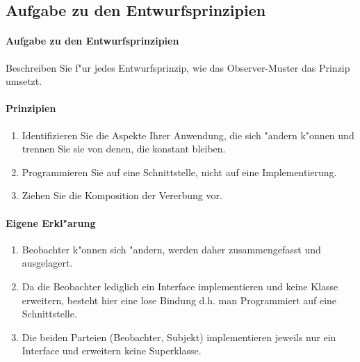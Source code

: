 \subsection{Aufgabe zu den Entwurfsprinzipien}
\paragraph{Aufgabe zu den Entwurfsprinzipien}
Beschreiben Sie f"ur jedes Entwurfsprinzip, wie das Observer-Muster das Prinzip umsetzt. 

\paragraph{Prinzipien}
\begin{enumerate}
\item Identifizieren Sie die Aspekte Ihrer Anwendung, die sich "andern k"onnen und trennen Sie sie 
   von denen, die konstant bleiben.
\item Programmieren Sie auf eine Schnittstelle, nicht auf eine Implementierung.
\item Ziehen Sie die Komposition der Vererbung vor.
\end{enumerate}

\paragraph{Eigene Erkl"arung}
\begin{enumerate}
\item Beobachter k"onnen sich "andern, werden daher zusammengefasst und ausgelagert.
\item Da die Beobachter lediglich ein Interface implementieren und keine Klasse erweitern, besteht 
   hier eine lose Bindung d.h. man Programmiert auf eine Schnittstelle.
\item Die beiden Parteien (Beobachter, Subjekt) implementieren jeweils nur ein Interface und 
   erweitern keine Superklasse.
\end{enumerate}
   
